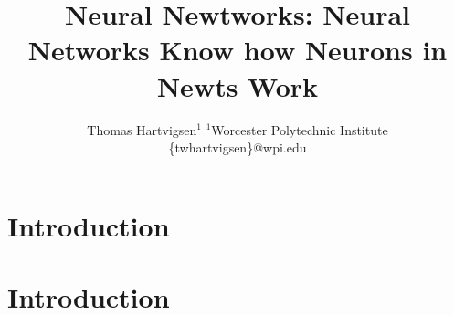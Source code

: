 




\title{Neural Newtworks: Neural Networks Know how Neurons in Newts Work}
\author{
    Thomas Hartvigsen$^1$
    \affiliations
    $^1$Worcester Polytechnic Institute\\
    \emails
    \{twhartvigsen\}@wpi.edu
}



\maketitle

\begin{abstract}
    
\end{abstract}

\section{Introduction}
    
\section{Introduction}





